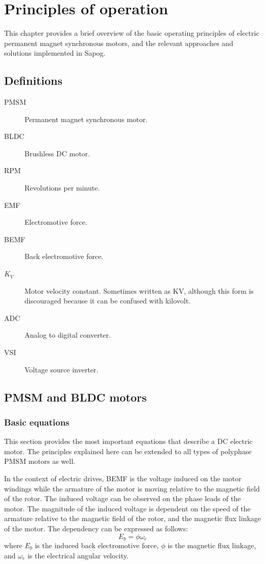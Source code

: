 \documentclass{zubaxdoc}
\begin{document}
\begin{titlepage}
\end{titlepage}

\tableofcontents
\listoffigures
\listoftables

\mainmatter

\chapter{Principles of operation}

This chapter provides a brief overview of the basic operating principles of electric permanent magnet
synchronous motors, and the relevant approaches and solutions implemented in Sapog.

\section{Definitions}

\begin{description}
    \item[PMSM] Permanent magnet synchronous motor.
    \item[BLDC] Brushless DC motor.
    \item[RPM] Revolutions per minute.
    \item[EMF] Electromotive force.
    \item[BEMF] Back electromotive force.
    \item[$K_V$] Motor velocity constant. Sometimes written as KV, although
    this form is discouraged because it can be confused with kilovolt.
    \item[ADC] Analog to digital converter.
    \item[VSI] Voltage source inverter.
\end{description}

\section{PMSM and BLDC motors}

\subsection{Basic equations}\label{sec:motor_equations}

This section provides the most important equations that describe a DC electric motor.
The principles explained here can be extended to all types of polyphase PMSM motors as well.

In the context of electric drives, BEMF is the voltage induced on the motor windings
while the armature of the motor is moving relative to the magnetic field of the rotor.
The induced voltage can be observed on the phase leads of the motor.
The magnitude of the induced voltage is dependent on the speed of the armature relative to the magnetic field
of the rotor, and the magnetic flux linkage of the motor. The dependency can be expressed as follows:
\begin{equation}
E_b = \phi \omega_e
\end{equation}
where $E_b$ is the induced back electromotive force, $\phi$ is the magnetic flux linkage,
and $\omega_e$ is the electrical angular velocity.
\end{document}
